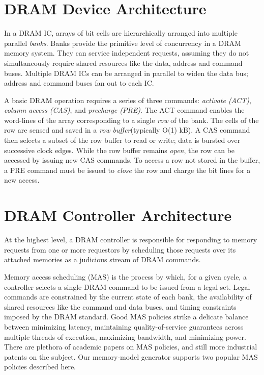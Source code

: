 \section{DRAM Device Architecture}
In a DRAM IC, arrays of bit cells are hierarchically arranged into multiple
parallel \emph{banks}. Banks provide the primitive level of concurrency in a
DRAM memory system. They can service independent requests, assuming they do not
simultaneously require shared resources like the data, address and command
buses.  Multiple DRAM ICs can be arranged in parallel to widen the data bus;
address and command buses fan out to each IC.

A basic DRAM operation requires a series of three commands: \emph{activate
(ACT)}, \emph{column access (CAS)}, and \emph{precharge (PRE)}. The ACT
command enables the word-lines of the array corresponding to a single
\emph{row} of the bank. The cells of the row are sensed and saved in a
\emph{row buffer}(typically O(1) kB). A CAS command then selects a subset of
the row buffer to read or write; data is bursted over successive clock edges.
While the row buffer remains \emph{open}, the row can be accessed by issuing
new CAS commands. To access a row not stored in the buffer, a PRE command must
be issued to \emph{close} the row and charge the bit lines for a new access.

\section{DRAM Controller Architecture}

At the highest level, a DRAM controller is responsible for responding to memory
requests from one or more requestors by scheduling those requests over its
attached memories as a judicious stream of DRAM commands.

Memory access scheduling (MAS) is the process by which, for a given cycle, a
controller selects a single DRAM command to be issued from a legal set. Legal
commands are constrained by the current state of each bank, the availability
of shared resources like the command and data buses, and timing constraints
imposed by the DRAM standard. Good MAS policies strike a delicate balance
between minimizing latency, maintaining quality-of-service guarantees across
multiple threads of execution, maximizing bandwidth, and minimizing power.
There are plethora of academic papers on MAS policies, and still more
industrial patents on the subject. Our memory-model generator supports two popular MAS policies
described here.

